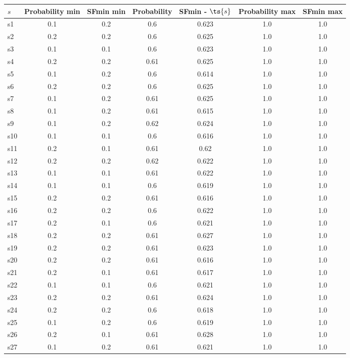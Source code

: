 \documentclass{article}
\begin{document}
\noindent\begin{tabular}{|l|c|c|c|c|c|c|}
\hline
$s$& Probability min & SFmin min & Probability & SFmin - $\ts{s}$ & Probability max & SFmin max\\
\hline
s1 &0.1 & 0.2 & 0.6 & 0.623 & 1.0 & 1.0\\
\hline
s2 &0.2 & 0.2 & 0.6 & 0.625 & 1.0 & 1.0\\
\hline
s3 &0.1 & 0.1 & 0.6 & 0.623 & 1.0 & 1.0\\
\hline
s4 &0.2 & 0.2 & 0.61 & 0.625 & 1.0 & 1.0\\
\hline
s5 &0.1 & 0.2 & 0.6 & 0.614 & 1.0 & 1.0\\
\hline
s6 &0.2 & 0.2 & 0.6 & 0.625 & 1.0 & 1.0\\
\hline
s7 &0.1 & 0.2 & 0.61 & 0.625 & 1.0 & 1.0\\
\hline
s8 &0.1 & 0.2 & 0.61 & 0.615 & 1.0 & 1.0\\
\hline
s9 &0.1 & 0.2 & 0.62 & 0.624 & 1.0 & 1.0\\
\hline
s10 &0.1 & 0.1 & 0.6 & 0.616 & 1.0 & 1.0\\
\hline
s11 &0.2 & 0.1 & 0.61 & 0.62 & 1.0 & 1.0\\
\hline
s12 &0.2 & 0.2 & 0.62 & 0.622 & 1.0 & 1.0\\
\hline
s13 &0.1 & 0.1 & 0.61 & 0.622 & 1.0 & 1.0\\
\hline
s14 &0.1 & 0.1 & 0.6 & 0.619 & 1.0 & 1.0\\
\hline
s15 &0.2 & 0.2 & 0.61 & 0.616 & 1.0 & 1.0\\
\hline
s16 &0.2 & 0.2 & 0.6 & 0.622 & 1.0 & 1.0\\
\hline
s17 &0.2 & 0.1 & 0.6 & 0.621 & 1.0 & 1.0\\
\hline
s18 &0.2 & 0.2 & 0.61 & 0.627 & 1.0 & 1.0\\
\hline
s19 &0.2 & 0.2 & 0.61 & 0.623 & 1.0 & 1.0\\
\hline
s20 &0.2 & 0.2 & 0.61 & 0.616 & 1.0 & 1.0\\
\hline
s21 &0.2 & 0.1 & 0.61 & 0.617 & 1.0 & 1.0\\
\hline
s22 &0.1 & 0.1 & 0.6 & 0.621 & 1.0 & 1.0\\
\hline
s23 &0.2 & 0.2 & 0.61 & 0.624 & 1.0 & 1.0\\
\hline
s24 &0.2 & 0.2 & 0.6 & 0.618 & 1.0 & 1.0\\
\hline
s25 &0.1 & 0.2 & 0.6 & 0.619 & 1.0 & 1.0\\
\hline
s26 &0.2 & 0.1 & 0.61 & 0.628 & 1.0 & 1.0\\
\hline
s27 &0.1 & 0.2 & 0.61 & 0.621 & 1.0 & 1.0\\

\end{tabular}
\end{document}
